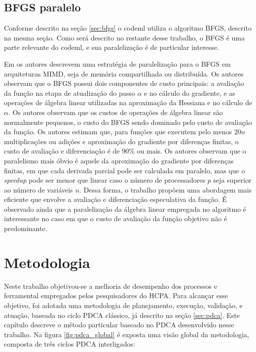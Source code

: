 \documentclass[cic,tc]{iiufrgs}
\begin{document}
\section{BFGS paralelo}
\label{sec:parbfgs}

Conforme descrito na seção \ref{sec:bfgs} o codeml utiliza o algoritmo BFGS,
descrito na mesma seção. Como será descrito no restante desse trabalho, o BFGS
é uma parte relevante do codeml, e sua paralelização é de particular interesse.

Em \cite{byrd1988parallel} os autores descrevem uma estratégia de paralelização
para o BFGS em arquiteturas MIMD, seja de memória compartilhada ou distribuída.
Os autores observam que o BFGS possui dois componentes de custo principais: a
avaliação da função na etapa de atualização do passo $\alpha$ e no cálculo do
gradiente, e as operações de álgebra linear utilizadas na aproximação da
Hessiana e no cálculo de $\alpha$. Os autores observam que os custos de
operações de álgebra linear são normalmente pequenos, o custo do BFGS sendo
dominado pelo custo de avaliação da função. Os autores estimam que, para
funções que executem pelo menos $20n$ multiplicações ou adições e aproximação
do gradiente por diferenças finitas, o custo de avaliação e diferenciação é de
90\% ou mais. Os autores observam que o paralelismo mais óbvio é aquele da
aproximação do gradiente por diferenças finitas, em que cada derivada parcial
pode ser calculada em paralelo, mas que o \textit{speedup} pode ser menor que
linear caso o número de processadores $p$ seja superior ao número de variáveis
$n$. Dessa forma, o trabalho propõem uma abordagem mais eficiente que envolve a
avaliação e diferenciação especulativa da função. É observado ainda que a
paralelização da álgebra linear empregada no algoritmo é interessante no caso
em que o custo de avaliação da função objetivo não é predominante.

%
%
%
%

\chapter{Metodologia} 
\label{chap:mod}

Neste trabalho objetivou-se a melhoria de desempenho dos processos e
ferramental empregados pelos pesquisadores do HCPA. Para alcançar esse
objetivo, foi adotada uma metodologia de planejamento, execução, validação, e
atuação, baseada no ciclo PDCA clássico, já descrito na seção \ref{sec:pdca}.
Este capítulo descreve o método particular baseado no PDCA desenvolvido nesse
trabalho. Na figura \ref{fig:pdca_global} é exposta uma visão global da
metodologia, composta de três ciclos PDCA interligados:
\end{document}
